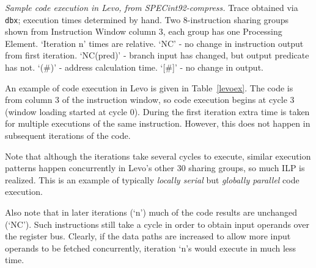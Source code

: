 \documentclass[10pt,dvips]{article}
\begin{document}
\begin{landscape}
\begin{table}
\caption{\textit{Sample code execution in Levo, from SPECint92-compress.}
Trace obtained via {\tt dbx}; execution times determined by hand. Two 8-instruction
sharing groups shown from Instruction Window column 3, each group
has one Processing Element. `Iteration n' times are
relative. `NC' - no change in
instruction output from first iteration. `NC(pred)' - branch input has changed, but
output predicate has not. `(\#)' - address calculation time. `[\#]' - no change in
output.}
\label{levoex}
\end{table}

An example of code execution in Levo is given in Table~\ref{levoex}. The code is from
column 3 of the instruction window, so code execution begins at cycle 3 (window loading
started at cycle 0). During the first iteration extra time is taken for multiple
executions of the same instruction. However, this does not happen in subsequent iterations
of the code.

Note that although the iterations take several cycles to execute, similar
execution patterns happen concurrently in Levo's other 30 sharing groups, so much ILP
is realized. This is an example of typically {\it locally serial} but {\it globally
parallel} code execution.

Also note that in later iterations (`n') much of the code results are unchanged (`NC').
Such instructions still take a cycle in order to obtain input operands over the
register bus. Clearly, if the data paths are increased to allow more input operands
to be fetched concurrently, iteration `n's would execute in much less time.
\end{landscape}
\end{document}
